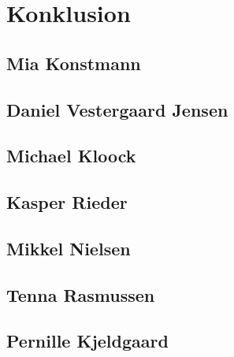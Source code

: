 \chapter{Konklusion}

\section{Mia Konstmann}
\section{Daniel Vestergaard Jensen}
\section{Michael Kloock}
\section{Kasper Rieder}
\section{Mikkel Nielsen}
\section{Tenna Rasmussen}
\section{Pernille Kjeldgaard}